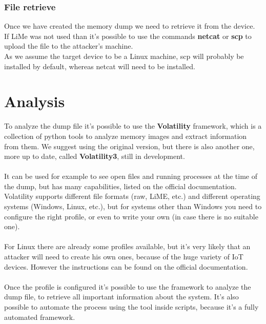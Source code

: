 \subsubsection{File retrieve}
Once we have created the memory dump we need to retrieve it from the device.\\
If LiMe was not used than it's possible to use the commands \textbf{netcat}\cite{netcat} or \textbf{scp}\cite{scp}
to upload the file to the attacker's machine.\\
As we assume the target device to be a Linux machine, scp will probably be installed
by default, whereas netcat will need to be installed.

\section{Analysis}
To analyze the dump file it's possible to use the \textbf{Volatility}\cite{volatility} framework, which is a collection
of python tools to analyze memory images and extract information from them.
We suggest using the original version, but there is also another one, more up to date, called \textbf{Volatility3}\cite{volatility3},
still in development.\\\\
It can be used for example to see open files and running processes at the time of the dump, but
has many capabilities, listed on the official documentation. Volatility supports
different file formats (raw, LiME, etc.) and different operating systems (Windows, Linux, etc.),
but for systems other than Windows you need to configure the right profile,
or even to write your own (in case there is no suitable one).\\\\
For Linux there are already some profiles available, but it's very likely that
an attacker will need to create his own ones, because of the huge variety of 
IoT devices. However the instructions can be found on the official documentation\cite{volatility-conf}.\\\\
Once the profile is configured it's possible to use the framework to analyze the dump file, to
retrieve all important information about the system. It's also possible to 
automate the process using the tool inside scripts, because it's a fully automated
framework.\\\\
\newpage